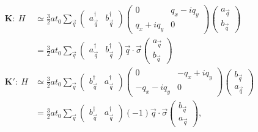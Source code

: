 \begin{align}
	\bm{K:} \ H&\simeq\frac{3}{2} a t_0 \sum_{\vec q} 
		\left( \begin{array}{cc} a^{\dagger}_{\vec{q}} & b^{\dagger}_{\vec{q}} \end{array} \right)
		\left( \begin{array}{cc}
			0              & q_x - i q_y\\
			q_x+i q_y      & 0                                                 \end{array} \right)
		\left( \begin{array}{c } a_{\vec{q}}           \\ b_{\vec{q}}          \end{array} \right) \\
	  &=\frac{3}{2} a t_0 \sum_{\vec q}
		\left( \begin{array}{cc} a^{\dagger}_{\vec{q}} & b^{\dagger}_{\vec{q}} \end{array} \right)
		\vec{q} \cdot \vec{\sigma}
		\left( \begin{array}{c } a_{\vec{q}}           \\ b_{\vec{q}}          \end{array} \right) \\
	\bm{K':} \ H& \simeq \frac{3}{2} a t_0 \sum_{\vec q} 
		\left( \begin{array}{cc} b^{\dagger}_{\vec{q}} & a^{\dagger}_{\vec{q}} \end{array} \right)
		\left( \begin{array}{cc}
			0              & -q_x + i q_y\\
			-q_x-i q_y     & 0                                                 \end{array} \right)
		\left( \begin{array}{c } b_{\vec{q}}           \\ a_{\vec{q}}          \end{array} \right) \\
	  &=\frac{3}{2} a t_0 \sum_{\vec q}
		\left( \begin{array}{cc} b^{\dagger}_{\vec{q}} & a^{\dagger}_{\vec{q}} \end{array} \right)
		(-1)\vec{q} \cdot \vec{\sigma}
		\left( \begin{array}{c } b_{\vec{q}}           \\ a_{\vec{q}}          \end{array} \right), \\
\end{align}

